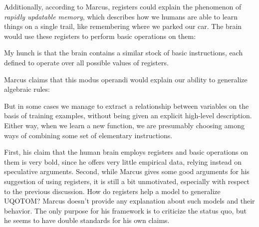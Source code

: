 \documentclass[../../main.tex]{subfiles}
\begin{document}
Additionally, according to Marcus, registers could explain the phenomenon of \emph{rapidly updatable memory}, which describes how we humans are able to learn things on a single trail, like remembering where we parked our car. The brain would use these registers to perform basic operations on them:

\begin{citecallout}
    My hunch
    is that the brain contains a similar stock of basic instructions, each defined to operate over all possible values of registers.
\end{citecallout}

Marcus claims that this modus operandi would explain our ability to generalize algebraic rules:

\begin{citecallout}
    But in some cases we manage to extract a relationship between
    variables on the basis of training examples, without being given an explicit high-level description. Either way, when we learn a new function,
    we are presumably choosing among ways of combining some set of
    elementary instructions.
\end{citecallout}

\begin{critique}
    First, his claim that the human brain employs registers and basic operations on them is very bold, since he offers very little empirical data, relying instead on speculative arguments.
    Second, while Marcus gives some good arguments for his suggestion of using registers, it is still a bit unmotivated, especially with respect to the previous discussion. How do registers help a model to generalize UQOTOM? Marcus doesn't provide any explanation about such models and their behavior. The only purpose for his framework is to criticize the status quo, but he seems to have double standards for his own claims.
\end{critique}

\end{document}
